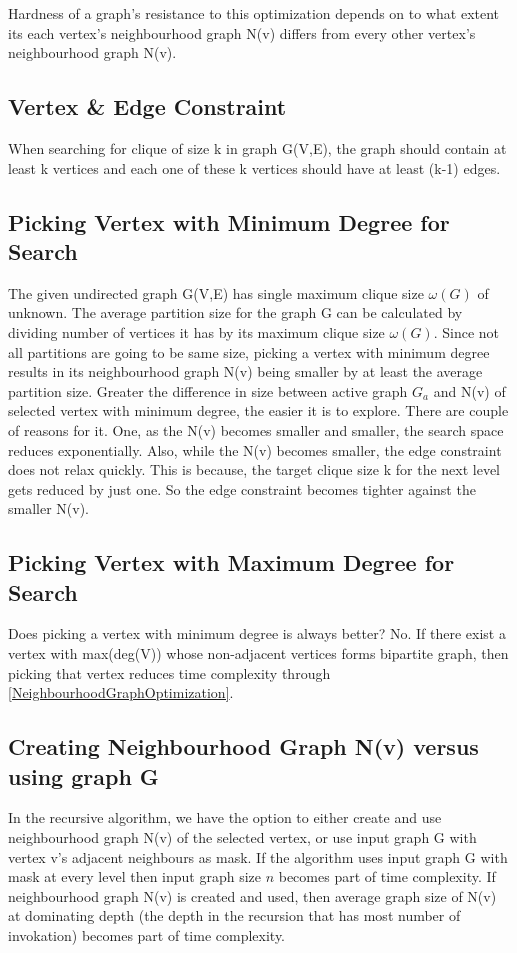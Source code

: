 \documentclass[12pt]{article}
\theoremstyle{plain}
\theoremstyle{definition}
\begin{document}
Hardness of a graph's resistance to this optimization depends on to what extent its each vertex's neighbourhood graph N(v) differs from every other vertex's neighbourhood graph N(v).

\subsection{Vertex \& Edge Constraint}
When searching for clique of size k in graph G(V,E), the graph should contain at least k vertices and each one of these k vertices should have at least (k-1) edges.


\subsection{Picking Vertex with Minimum Degree for Search}
The given undirected graph G(V,E) has single maximum clique size $\omega(G)$ of unknown. The average partition size for the graph G can be calculated by dividing number of vertices it has by its maximum clique size $\omega(G)$. Since not all partitions are going to be same size, picking a vertex with minimum degree results in its neighbourhood graph N(v) being smaller by at least the average partition size. Greater the difference in size between active graph $G_a$ and N(v) of selected vertex with minimum degree, the easier it is to explore. There are couple of reasons for it. One, as the N(v) becomes smaller and smaller, the search space reduces exponentially. Also, while the N(v) becomes smaller, the edge constraint does not relax quickly. This is because, the target clique size k for the next level gets reduced by just one. So the edge constraint becomes tighter against the smaller N(v).

\subsection{Picking Vertex with Maximum Degree for Search}
Does picking a vertex with minimum degree is always better? No. If there exist a vertex with max(deg(V)) whose non-adjacent vertices forms bipartite graph, then picking that vertex reduces time complexity through  \ref{NeighbourhoodGraphOptimization}.

\subsection{Creating Neighbourhood Graph N(v) versus using graph G}
In the recursive algorithm, we have the option to either create and use neighbourhood graph N(v) of the selected vertex, or use input graph G with vertex v's adjacent neighbours as mask. If the algorithm uses input graph G with mask at every level then input graph size $n$ becomes part of time complexity. If neighbourhood graph N(v) is created and used, then average graph size of N(v) at dominating depth (the depth in the recursion that has most number of invokation) becomes part of time complexity.
\end{document}
